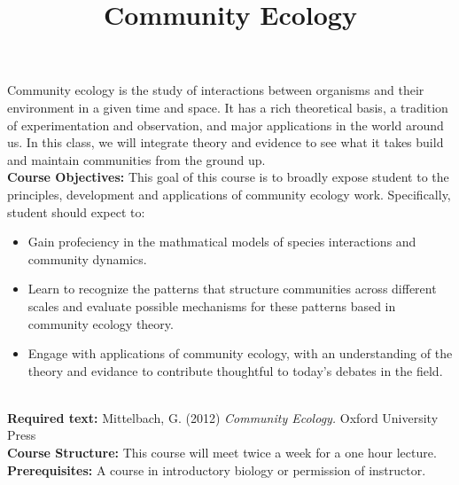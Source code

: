 \documentclass{article}\usepackage[]{graphicx}\usepackage[]{color}
\begin{document}
\title{Community Ecology}
\date{}
\maketitle{}
Community ecology is the study of interactions between organisms and their environment in a given time and space. It has a rich theoretical basis, a tradition of experimentation and observation, and major applications in the world around us. In this class, we will integrate theory and evidence to see what it takes build and maintain communities from the ground up. \\

\textbf{Course Objectives:} This goal of this course is to broadly expose student to the principles, development and applications of community ecology work. Specifically, student should expect to:
\begin{itemize}
\item Gain profeciency in the mathmatical models of species interactions and community dynamics.
\item Learn to recognize the patterns that structure communities across different scales and evaluate possible mechanisms for these patterns based in community ecology theory.
\item  Engage with applications of community ecology, with an understanding of the theory and evidance to contribute thoughtful to today's debates in the field.
\end{itemize}\\

\textbf{Required text:} Mittelbach, G. (2012) \textit{Community Ecology.} Oxford University Press \\

\textbf{Course Structure:} This course will meet twice a week for a one hour lecture.\\

\textbf{Prerequisites:} A course in introductory biology or permission of instructor.\\
\end{document}
